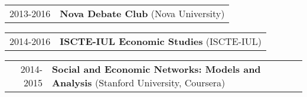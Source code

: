 \documentclass[a4paper,11pt]{article} %
\begin{document}
\begin{tabular}{r|p{15cm}}
	2013-2016 & \textbf{Nova Debate Club} (Nova University)
\end{tabular}

\begin{tabular}{r|p{15cm}}
	2014-2016 & \textbf{ISCTE-IUL Economic Studies} (ISCTE-IUL)
\end{tabular}

\begin{tabular}{r|p{15cm}}
	2014-2015 & \textbf{Social and Economic Networks: Models and Analysis} (Stanford University, Coursera)
\end{tabular}

%
\end{document}
